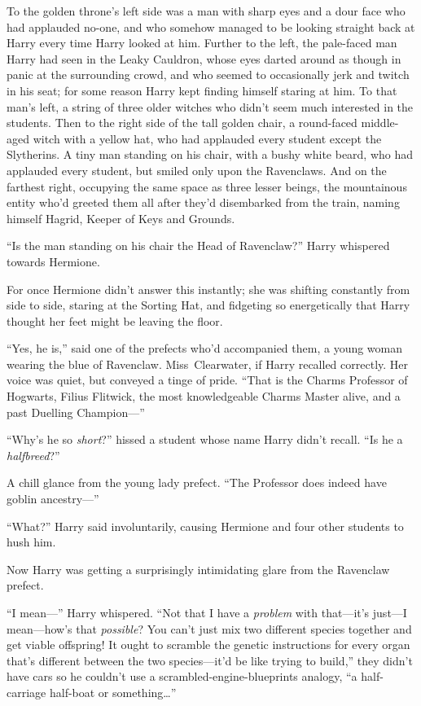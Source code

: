 To the golden throne’s left side was a man with sharp eyes and a dour face who had applauded no-one, and who somehow managed to be looking straight back at Harry every time Harry looked at him. Further to the left, the pale-faced man Harry had seen in the Leaky Cauldron, whose eyes darted around as though in panic at the surrounding crowd, and who seemed to occasionally jerk and twitch in his seat; for some reason Harry kept finding himself staring at him. To that man’s left, a string of three older witches who didn’t seem much interested in the students. Then to the right side of the tall golden chair, a round-faced middle-aged witch with a yellow hat, who had applauded every student except the Slytherins. A tiny man standing on his chair, with a bushy white beard, who had applauded every student, but smiled only upon the Ravenclaws. And on the farthest right, occupying the same space as three lesser beings, the mountainous entity who’d greeted them all after they’d disembarked from the train, naming himself Hagrid, Keeper of Keys and Grounds.

“Is the man standing on his chair the Head of Ravenclaw?” Harry whispered towards Hermione.

For once Hermione didn’t answer this instantly; she was shifting constantly from side to side, staring at the Sorting Hat, and fidgeting so energetically that Harry thought her feet might be leaving the floor.

“Yes, he is,” said one of the prefects who’d accompanied them, a young woman wearing the blue of Ravenclaw. Miss~Clearwater, if Harry recalled correctly. Her voice was quiet, but conveyed a tinge of pride. “That is the Charms Professor of Hogwarts, Filius Flitwick, the most knowledgeable Charms Master alive, and a past Duelling Champion—”

“Why’s he so \emph{short}?” hissed a student whose name Harry didn’t recall. “Is he a \emph{halfbreed}?”

A chill glance from the young lady prefect. “The Professor does indeed have goblin ancestry—”

“What?” Harry said involuntarily, causing Hermione and four other students to hush him.

Now Harry was getting a surprisingly intimidating glare from the Ravenclaw prefect.

“I mean—” Harry whispered. “Not that I have a \emph{problem} with that—it’s just—I mean—how’s that \emph{possible}? You can’t just mix two different species together and get viable offspring! It ought to scramble the genetic instructions for every organ that’s different between the two species—it’d be like trying to build,” they didn’t have cars so he couldn’t use a scrambled-engine-blueprints analogy, “a half-carriage half-boat or something…”

